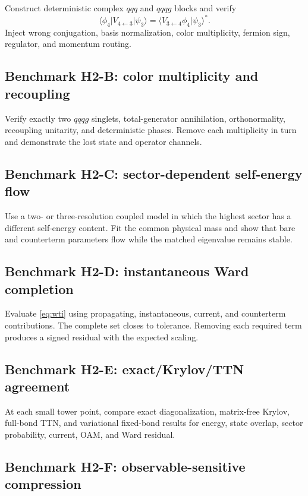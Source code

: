 \documentclass[11pt]{article}
\begin{document}
Construct deterministic complex \(qqq\) and \(qqqg\) blocks and verify
\begin{equation}
 \langle\phi_4|V_{4\leftarrow3}|\psi_3\rangle
 =
 \langle V_{3\leftarrow4}\phi_4|\psi_3\rangle^*.
\end{equation}
Inject wrong conjugation, basis normalization, color multiplicity, fermion
sign, regulator, and momentum routing.

\subsection{Benchmark H2-B: color multiplicity and recoupling}

Verify exactly two \(qqqg\) singlets, total-generator annihilation,
orthonormality, recoupling unitarity, and deterministic phases.  Remove each
multiplicity in turn and demonstrate the lost state and operator channels.

\subsection{Benchmark H2-C: sector-dependent self-energy flow}

Use a two- or three-resolution coupled model in which the highest sector has a
different self-energy content.  Fit the common physical mass and show that
bare and counterterm parameters flow while the matched eigenvalue remains
stable.

\subsection{Benchmark H2-D: instantaneous Ward completion}

Evaluate \cref{eq:wti} using propagating, instantaneous, current, and
counterterm contributions.  The complete set closes to tolerance.  Removing
each required term produces a signed residual with the expected scaling.

\subsection{Benchmark H2-E: exact/Krylov/TTN agreement}

At each small tower point, compare exact diagonalization, matrix-free Krylov,
full-bond TTN, and variational fixed-bond results for energy, state overlap,
sector probability, current, OAM, and Ward residual.

\subsection{Benchmark H2-F: observable-sensitive compression}
\end{document}
